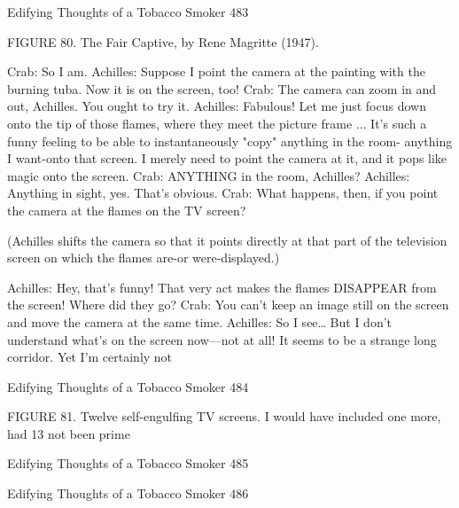 {Edifying Thoughts of a Tobacco Smoker                                                     483

                FIGURE 80. The Fair Captive, by Rene Magritte (1947).

Crab: So I am.
Achilles: Suppose I point the camera at the painting with the burning tuba. Now it is on
  the screen, too!
Crab: The camera can zoom in and out, Achilles. You ought to try it. Achilles: Fabulous!
  Let me just focus down onto the tip of those flames, where they meet the picture frame
  ... It's such a funny feeling to be able to instantaneously "copy" anything in the room-
  anything I want-onto that screen. I merely need to point the camera at it, and it pops
  like magic onto the screen.
Crab: ANYTHING in the room, Achilles? Achilles: Anything in sight, yes. That's
  obvious.
Crab: What happens, then, if you point the camera at the flames on the TV screen?

  (Achilles shifts the camera so that it points directly at that part of the television
  screen on which the flames are-or were-displayed.)

Achilles: Hey, that's funny! That very act makes the flames DISAPPEAR from the
  screen! Where did they go?
Crab: You can't keep an image still on the screen and move the camera at the same time.
Achilles: So I see… But I don’t understand what’s on the screen now—not at all! It
  seems to be a strange long corridor. Yet I’m certainly not




Edifying Thoughts of a Tobacco Smoker                                                 484

FIGURE 81. Twelve self-engulfing TV screens. I would have included one more, had 13
  not been prime



Edifying Thoughts of a Tobacco Smoker                                          485

Edifying Thoughts of a Tobacco Smoker   486

}
